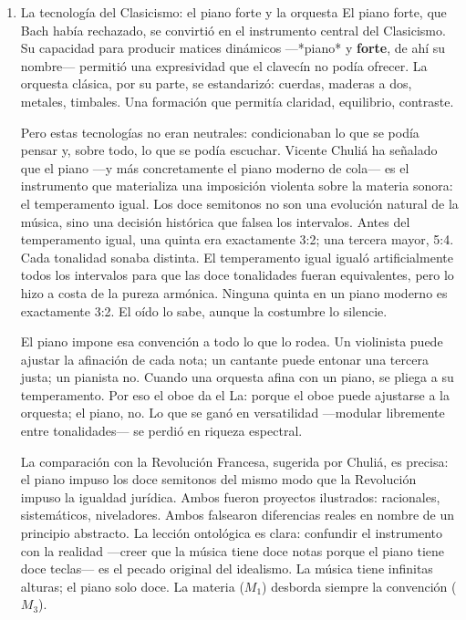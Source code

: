 \documentclass[14pt, a4paper]{article}
\begin{document}
\begin{enumerate}
Desde el materialismo filosófico, tanto Kant como Hegel comparten un
mismo error: juzgan la música desde el concepto (\(M_3\)), no desde la
materia (\(M_1\)). La forma sonata no es una idea: es una organización
material de vibraciones en el tiempo. Beethoven no expresaba
sentimientos: organizaba sonidos. Que esos sonidos produzcan
sentimientos en el oyente (\(M_2\)) es un efecto, no una causa.
\item La tecnología del Clasicismo: el piano forte y la orquesta
\label{tecnologia-clasicismo}
El piano forte, que Bach había rechazado, se convirtió en el
instrumento central del Clasicismo. Su capacidad para producir matices
dinámicos —*piano* y \textbf{forte}, de ahí su nombre— permitió una
expresividad que el clavecín no podía ofrecer. La orquesta clásica,
por su parte, se estandarizó: cuerdas, maderas a dos, metales,
timbales. Una formación que permitía claridad, equilibrio, contraste.

Pero estas tecnologías no eran neutrales: condicionaban lo que se
podía pensar y, sobre todo, lo que se podía escuchar. Vicente Chuliá
ha señalado que el piano —y más concretamente el piano moderno de
cola— es el instrumento que materializa una imposición violenta sobre
la materia sonora: el temperamento igual. Los doce semitonos no son
una evolución natural de la música, sino una decisión histórica que
falsea los intervalos. Antes del temperamento igual, una quinta era
exactamente 3:2; una tercera mayor, 5:4. Cada tonalidad sonaba
distinta. El temperamento igual igualó artificialmente todos los
intervalos para que las doce tonalidades fueran equivalentes, pero lo
hizo a costa de la pureza armónica. Ninguna quinta en un piano
moderno es exactamente 3:2. El oído lo sabe, aunque la costumbre lo
silencie.

El piano impone esa convención a todo lo que lo rodea. Un violinista
puede ajustar la afinación de cada nota; un cantante puede entonar una
tercera justa; un pianista no. Cuando una orquesta afina con un piano,
se pliega a su temperamento. Por eso el oboe da el La: porque el oboe
puede ajustarse a la orquesta; el piano, no. Lo que se ganó en
versatilidad —modular libremente entre tonalidades— se perdió en
riqueza espectral.

La comparación con la Revolución Francesa, sugerida por Chuliá, es
precisa: el piano impuso los doce semitonos del mismo modo que la
Revolución impuso la igualdad jurídica. Ambos fueron proyectos
ilustrados: racionales, sistemáticos, niveladores. Ambos falsearon
diferencias reales en nombre de un principio abstracto. La lección
ontológica es clara: confundir el instrumento con la realidad —creer
que la música tiene doce notas porque el piano tiene doce teclas— es
el pecado original del idealismo. La música tiene infinitas alturas;
el piano solo doce. La materia (\(M_1\)) desborda siempre la convención
(\(M_3\)).
\end{enumerate}
\end{document}
